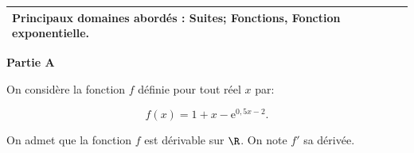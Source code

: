 \medskip

\begin{tabularx}{\linewidth}{|X|}\hline
\textbf{Principaux domaines abordés :} Suites;
Fonctions, Fonction exponentielle.\\ \hline
\end{tabularx}

\bigskip

\textbf{Partie A}

\medskip

On considère la fonction $f$ définie pour tout réel $x$ par:

\[f(x) = 1+x - \text{e}^{0,5x - 2}.\]

On admet que la fonction $f$ est dérivable sur $\R$. On note $f'$ sa dérivée.

\medskip

